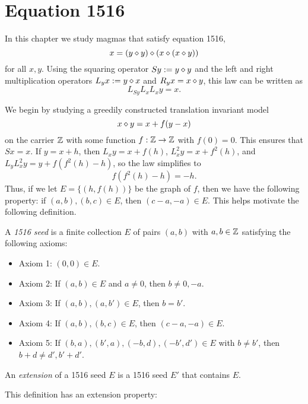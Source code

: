 \chapter{Equation 1516}\label{1516-chapter}

In this chapter we study magmas that satisfy equation 1516,
\begin{equation}\label{1516}
  x = (y \diamond y) \diamond (x \diamond (x \diamond y))
\end{equation}
for all $x,y$.  Using the squaring operator $Sy := y \diamond y$ and the left and right multiplication operators $L_y x := y \diamond x$ and $R_y x = x \diamond y$, this law can be written as
$$ L_{Sy} L_x L_x y = x.$$

We begin by studying a greedily constructed translation invariant model
\begin{equation}\label{xy-1516}
   x \diamond y = x+f(y-x)
\end{equation}
on the carrier $\mathbb{Z}$ with some function $f:\mathbb{Z} \to \mathbb{Z}$ with $f(0)=0$.  This ensures that $Sx = x$.  If $y = x+h$, then $L_x y = x + f(h)$, $L_x^2 y = x + f^2(h)$, and $L_y L_x^2 y = y + f(f^2(h)-h)$, so the law  simplifies to
\begin{equation}\label{1516-f}
   f(f^2(h)-h) = -h.
\end{equation}
Thus, if we let $E = \{ (h, f(h))\}$ be the graph of $f$, then we have the following property: if $(a,b), (b,c) \in E$, then $(c-a,-a) \in E$.  This helps motivate the following definition.

\begin{definition}[1516 seed]\label{1516-seed}  A \emph{1516 seed} is a finite collection $E$ of pairs $(a,b)$ with $a,b \in \mathbb{Z}$ satisfying the following axioms:
  \begin{itemize}
  \item Axiom 1: $(0,0) \in E$.
  \item Axiom 2: If $(a,b) \in E$ and $a \neq 0$, then $b \neq 0, -a$.
  \item Axiom 3: If $(a,b), (a,b') \in E$, then $b=b'$.
  \item Axiom 4: If $(a,b), (b,c) \in E$, then $(c-a,-a) \in E$.
  \item Axiom 5: If $(b,a), (b',a), (-b, d), (-b',d') \in E$ with $b \neq b'$, then $b+d \neq d', b'+d'$.
  \end{itemize}
An \emph{extension} of a 1516 seed $E$ is a 1516 seed $E'$ that contains $E$.
\end{definition}

This definition has an extension property:

